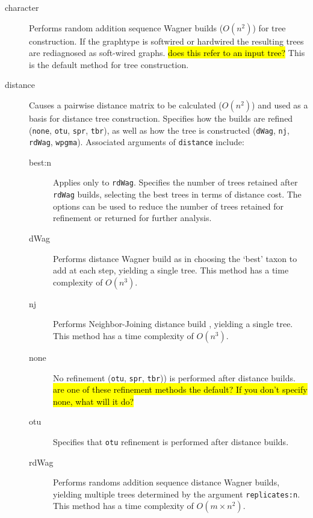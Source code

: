 \begin{description}
		\item [character] Performs random addition sequence Wagner \citep{Farris1970} builds 
		($O(n^2)$) for tree construction. If the graphtype is softwired or hardwired the resulting 
		trees are rediagnosed as soft-wired graphs. \hl{does this refer to an input tree?} This is 
		the default method for tree construction.
		
		\item [distance] Causes a pairwise distance matrix to be calculated ($O(n^2)$) and used 
		as a basis for distance tree construction. Specifies how the builds are refined (\texttt{none}, 
		\texttt{otu}, \texttt{spr}, \texttt{tbr}), as well as how the tree is constructed (\texttt{dWag}, 
		\texttt{nj}, \texttt{rdWag}, \texttt{wpgma}). Associated arguments of \texttt{distance} include:
				
		\begin{description}
			\item[best:n] Applies only to \texttt{rdWag}. Specifies the number of trees retained 
			after 	\texttt{rdWag} builds, selecting the best trees in terms of distance cost. The 
			options can be used to reduce the number of trees retained for refinement or returned 
			for further analysis.
			
			\item[dWag] Performs distance Wagner build as in \citep{Farris1972} choosing the 
			`best' taxon to 
			add at each step, yielding a single tree. This method has a time complexity of $O(n^3)$.

			\item[nj] Performs Neighbor-Joining distance build \citep{Saitou1987}, yielding a single 
			tree. This method has a time complexity of $O(n^3)$.

			\item[none] No refinement (\texttt{otu}, \texttt{spr}, \texttt{tbr})) is performed after 
			distance builds. \hl{are one of these refinement methods the default? If you don't 
			specify none, what will it do?}
			
			\item[otu] Specifies that \texttt{otu} refinement \citep{Wheeler2021} is performed 
			after distance 
			builds.
			
			\item[rdWag] Performs randoms addition sequence distance Wagner builds, 
			yielding multiple trees determined by the argument \texttt{replicates:n}. This 
			method has a time complexity of $O(m \times n^2)$.


\end{description}
\end{description}

